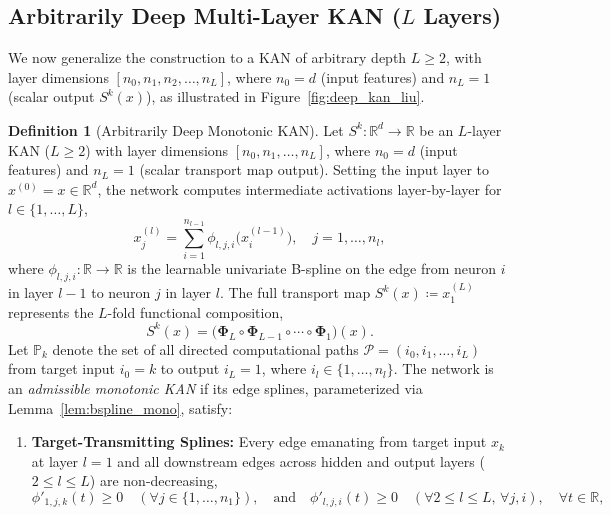 \documentclass[11pt,a4paper]{article}
\theoremstyle{plain}
\theoremstyle{definition}
\newtheorem{definition}[theorem]{Definition}
\theoremstyle{remark}
\begin{document}
\subsection{Arbitrarily Deep Multi-Layer KAN (\texorpdfstring{$L$}{L} Layers)}

We now generalize the construction to a KAN of arbitrary depth $L \ge 2$, with layer dimensions $[n_0, n_1, n_2, \dots, n_L]$, where $n_0 = d$ (input features) and $n_L = 1$ (scalar output $S^k(x)$), as illustrated in Figure~\ref{fig:deep_kan_liu}.

\begin{definition}[Arbitrarily Deep Monotonic KAN]
\label{def:deep_mono_kan}
\label{def:deep_kan}
Let $S^k: \mathbb{R}^d \to \mathbb{R}$ be an $L$-layer KAN ($L \ge 2$) with layer dimensions $[n_0, n_1, \dots, n_L]$, where $n_0 = d$ (input features) and $n_L = 1$ (scalar transport map output). Setting the input layer to $x^{(0)} = x \in \mathbb{R}^d$, the network computes intermediate activations layer-by-layer for $l \in \{1, \dots, L\}$,
\begin{equation}
    x^{(l)}_j = \sum_{i=1}^{n_{l-1}} \phi_{l, j, i}\big(x^{(l-1)}_i\big), \quad j = 1, \dots, n_l,
    \label{eq:kan_layer_def}
\end{equation}
where $\phi_{l, j, i}: \mathbb{R} \to \mathbb{R}$ is the learnable univariate B-spline on the edge from neuron $i$ in layer $l-1$ to neuron $j$ in layer $l$. The full transport map $S^k(x) \coloneqq x^{(L)}_1$ represents the $L$-fold functional composition,
\begin{equation}
    S^k(x) = \Big( \mathbf{\Phi}_L \circ \mathbf{\Phi}_{L-1} \circ \cdots \circ \mathbf{\Phi}_1 \Big)(x).
    \label{eq:kan_composition_def}
\end{equation}
Let $\mathbb{P}_k$ denote the set of all directed computational paths $\mathcal{P} = (i_0, i_1, \dots, i_L)$ from target input $i_0 = k$ to output $i_L = 1$, where $i_l \in \{1, \dots, n_l\}$. The network is an \emph{admissible monotonic KAN} if its edge splines, parameterized via Lemma~\ref{lem:bspline_mono}, satisfy:
\begin{enumerate}
    \item \textbf{Target-Transmitting Splines:} Every edge emanating from target input $x_k$ at layer $l=1$ and all downstream edges across hidden and output layers ($2 \le l \le L$) are non-decreasing,
    \begin{equation}
        \phi'_{1, j, k}(t) \ge 0 \quad (\forall j \in \{1, \dots, n_1\}), \quad \text{and} \quad \phi'_{l, j, i}(t) \ge 0 \quad (\forall 2 \le l \le L, \, \forall j, i), \quad \forall t \in \mathbb{R},

\end{equation}
\end{enumerate}
\end{definition}
\end{document}
